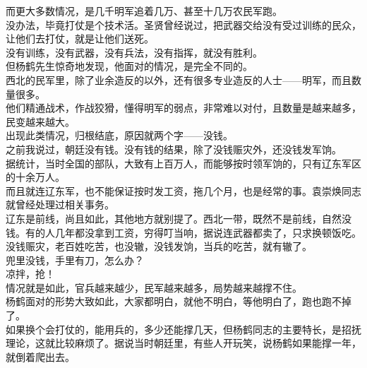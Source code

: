 \begin{multicols}{\theparacolNo}
而更大多数情况，是几千明军追着几万、甚至十几万农民军跑。\\

没办法，毕竟打仗是个技术活。圣贤曾经说过，把武器交给没有受过训练的民众，让他们去打仗，就是让他们送死。\\

没有训练，没有武器，没有兵法，没有指挥，就没有胜利。\\

但杨鹤先生惊奇地发现，他面对的情况，是完全不同的。\\

西北的民军里，除了业余造反的以外，还有很多专业造反的人士——明军，而且数量很多。\\

他们精通战术，作战狡猾，懂得明军的弱点，非常难以对付，且数量是越来越多，民变越来越大。\\

出现此类情况，归根结底，原因就两个字——没钱。\\

之前我说过，朝廷没有钱。没有钱的结果，除了没钱赈灾外，还没钱发军饷。\\

据统计，当时全国的部队，大致有上百万人，而能够按时领军饷的，只有辽东军区的十余万人。\\

而且就连辽东军，也不能保证按时发工资，拖几个月，也是经常的事。袁崇焕同志就曾经处理过相关事务。\\

辽东是前线，尚且如此，其他地方就别提了。西北一带，既然不是前线，自然没钱。有的人几年都没拿到工资，穷得叮当响，据说连武器都卖了，只求换顿饭吃。\\

没钱赈灾，老百姓吃苦，也没辙，没钱发饷，当兵的吃苦，就有辙了。\\

兜里没钱，手里有刀，怎么办？\\

凉拌，抢！\\

情况就是如此，官兵越来越少，民军越来越多，局势越来越撑不住。\\

杨鹤面对的形势大致如此，大家都明白，就他不明白，等他明白了，跑也跑不掉了。\\

如果换个会打仗的，能用兵的，多少还能撑几天，但杨鹤同志的主要特长，是招抚理论，这就比较麻烦了。据说当时朝廷里，有些人开玩笑，说杨鹤如果能撑一年，就倒着爬出去。\\


\end{multicols}
